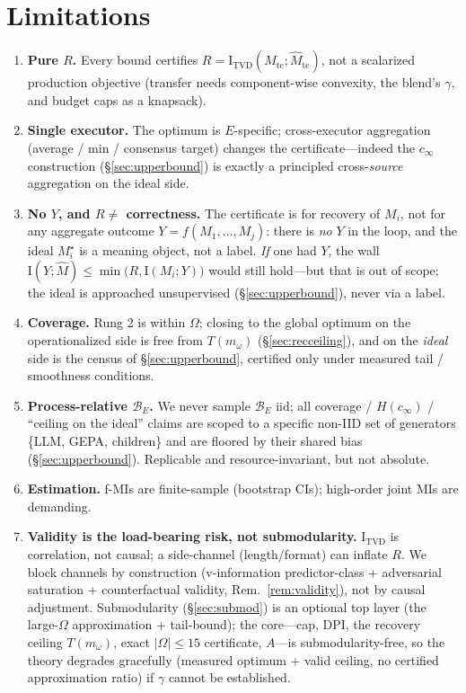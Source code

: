 \documentclass[11pt]{article}
\newcommand{\Iv}{\mathrm{I}}
\newcommand{\TVD}{\mathrm{TVD}}
\newcommand{\Mhat}{\widehat{M}}
\newcommand{\Bset}{\mathcal{B}_E}
\newcommand{\Om}{\Omega}
\newcommand{\te}{\mathrm{te}}
\newcommand{\Mw}{m_\omega}
\newcommand{\Mstar}{M_i^\star}
\newcommand{\cinf}{c_\infty}
\begin{document}
\section{Limitations}
\begin{enumerate}[leftmargin=1.5em,itemsep=1pt]
\item \textbf{Pure $R$.} Every bound certifies $R=\Iv_{\TVD}(M_\te;\Mhat_\te)$, not a scalarized
production objective (transfer needs component-wise convexity, the blend's $\gamma$, and budget caps as a
knapsack).
\item \textbf{Single executor.} The optimum is $E$-specific; cross-executor aggregation (average / min /
consensus target) changes the certificate---indeed the $\cinf$ construction (\S\ref{sec:upperbound}) is
exactly a principled cross-\emph{source} aggregation on the ideal side.
\item \textbf{No $Y$, and $R\ne$ correctness.} The certificate is for recovery of $M_i$, not for any
aggregate outcome $Y=f(M_1,\dots,M_j)$: there is \emph{no} $Y$ in the loop, and the ideal $\Mstar$ is a
meaning object, not a label. \emph{If} one had $Y$, the wall $\Iv(Y;\Mhat)\le\min\!\big(R,\Iv(M_i;Y)\big)$
would still hold---but that is out of scope; the ideal is approached unsupervised (\S\ref{sec:upperbound}),
never via a label.
\item \textbf{Coverage.} Rung 2 is within $\Om$; closing to the global optimum on the operationalized side
is free from $T(\Mw)$ (\S\ref{sec:recceiling}), and on the \emph{ideal} side is the census of
\S\ref{sec:upperbound}, certified only under measured tail / smoothness conditions.
\item \textbf{Process-relative $\Bset$.} We never sample $\Bset$ iid; all coverage / $H(\cinf)$ / ``ceiling
on the ideal'' claims are scoped to a specific non-IID set of generators \{LLM, GEPA, children\} and are
floored by their shared bias (\S\ref{sec:upperbound}). Replicable and resource-invariant, but not absolute.
\item \textbf{Estimation.} f-MIs are finite-sample (bootstrap CIs); high-order joint MIs are demanding.
\item \textbf{Validity is the load-bearing risk, not submodularity.} $\Iv_{\TVD}$ is correlation, not
causal; a side-channel (length/format) can inflate $R$. We block channels by construction (v-information
predictor-class + adversarial saturation + counterfactual validity, Rem.~\ref{rem:validity}), not by causal
adjustment. Submodularity (\S\ref{sec:submod}) is an optional top layer (the large-$\Om$ approximation +
tail-bound); the core---cap, DPI, the recovery ceiling $T(\Mw)$, exact $|\Om|\le15$ certificate, $A$---is
submodularity-free, so the theory degrades gracefully (measured optimum + valid ceiling, no certified
approximation ratio) if $\gamma$ cannot be established.
\end{enumerate}
\end{document}
